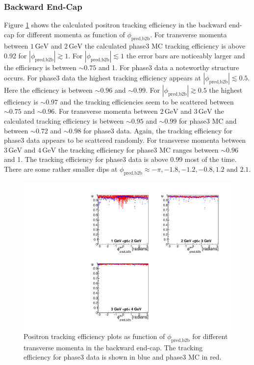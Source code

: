 \documentclass[a4paper,11pt,twosided,final,german,openbib,pdftex,listof=totoc,bibliography=totoc]{scrbook}
\begin{document}
\clearpage

\subsubsection{Backward End-Cap}


Figure \ref{plt:xPtMPhiepEC3} shows the calculated positron tracking efficiency in the backward end-cap for different momenta as function of $\phi_{\textrm{pred,b2b}}$.
For transverse momenta between $1\,\textrm{GeV}$ and $2\,\textrm{GeV}$ the calculated phase3 MC tracking efficiency is above 0.92 for $|\phi_{\textrm{pred,b2b}}| \gtrsim 1$. For $|\phi_{\textrm{pred,b2b}}| \lesssim 1$ the error bars are noticeably larger and the efficiency is between $\sim 0.75$ and 1. For phase3 data a noteworthy structure occurs. For phase3 data the highest tracking efficiency appears at $|\phi_{\textrm{pred,b2b}}| \lesssim 0.5$. Here the efficiency is between $\sim 0.96$ and $\sim 0.99$. For $|\phi_{\textrm{pred,b2b}}| \gtrsim 0.5$ the highest efficiency is $\sim 0.97$ and the tracking efficiencies seem to be scattered between $\sim 0.75$ and $\sim 0.96$.
For transverse momenta between $2\,\textrm{GeV}$ and $3\,\textrm{GeV}$ the calculated tracking efficiency is between $\sim 0.95$ and $\sim 0.99$ for phase3 MC and between $\sim 0.72$ and $\sim 0.98$ for phase3 data. Again, the tracking efficiency for phase3 data appears to be scattered randomly.
For transverse momenta between $3\,\textrm{GeV}$ and $4\,\textrm{GeV}$ the tracking efficiency for phase3 MC ranges between $\sim 0.96$ and 1. The tracking efficiency for phase3 data is above 0.99 most of the time. There are some rather smaller dips at $\phi_{\textrm{pred,b2b}} \approx -\pi, -1.8, -1.2, -0.8, 1.2 \textrm{ and } 2.1$.



\begin{figure}[!htbp]
	\centering
	\includegraphics[width=\textwidth]{Plots/master3/xPtMPhiepECP3}
	\caption[Transverse Momentum $\phi_{\textrm{pred,b2b}}$ Positron Backward End-Cap Efficiency Phase3]{Positron tracking efficiency plots as function of $\phi_{\textrm{pred,b2b}}$ for different transverse momenta in the backward end-cap. The tracking efficiency for phase3 data is shown in blue and phase3 MC in red.}
	
	\label{plt:xPtMPhiepEC3}
\end{figure}
\end{document}
